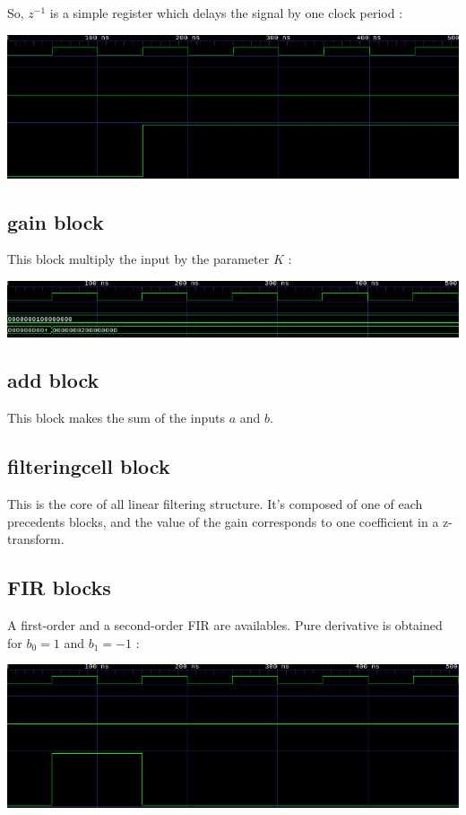 \documentclass{report}
\begin{document}
So, $z^{-1}$ is a simple register which delays the signal by one clock period :

\includegraphics[width=\textwidth]{images/zminus1.png}

\subsection*{gain block}

This block multiply the input by the parameter $K$ :

\includegraphics[width=\textwidth]{images/gain.png}

\subsection*{add block}

This block makes the sum of the inputs $a$ and $b$.

\subsection*{filteringcell block}

This is the core of all linear filtering structure. It's composed of one of each precedents blocks, and the value of the gain corresponds to one coefficient in a z-transform.

\subsection*{FIR blocks}

A first-order and a second-order FIR are availables. Pure derivative is obtained for $b_0=1$ and $b_1=-1$ :

\includegraphics[width=\textwidth]{images/derivative.png}
\end{document}
